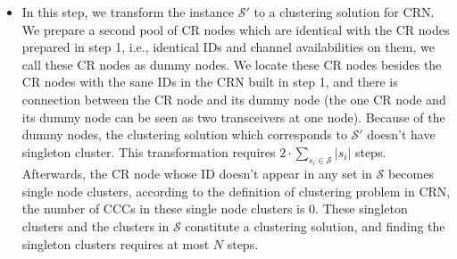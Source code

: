 \documentclass[10pt,journal,compsoc]{IEEEtran}
\makeatletter
\theoremstyle{mytheoremstyle}
\theoremstyle{mytheoremstyle}
\theoremstyle{mytheoremstyle}
\renewenvironment{proof}[1][\proofname]{%
      \par\pushQED{\qed}\fontfamily{ptm}\selectfont%
      \topsep6\p@\@plus6\p@\relax
      \trivlist\item[\hskip\labelsep\bfseries#1\@addpunct{.}]%
      \ignorespaces
    }{%
      \popQED\endtrivlist\@endpefalse
    }
\newcommand{\ie}{i.e., }
\makeatother
\begin{document}
\begin{proof}
\begin{itemize}
\item In this step, we transform the instance $\mathcal{S'}$ to a clustering solution for CRN.
We prepare a second pool of CR nodes which are identical with the CR nodes prepared in step 1, i.e., identical IDs and channel availabilities on them, we call these CR nodes as dummy nodes.
We locate these CR nodes besides the CR nodes with the sane IDs in the CRN built in step 1, and there is connection between the CR node and its dummy node (the one CR node and its dummy node can be seen as two transceivers at one node).
Because of the dummy nodes, the clustering solution which corresponds to $\mathcal{S'}$ doesn't have singleton cluster.
This transformation requires $2\cdot\sum_{s_i \in \mathcal{S}} |s_i|$ steps.
%
Afterwards, the CR node whose ID doesn't appear in any set in $\mathcal{S}$ becomes single node clusters, according to the definition of clustering problem in CRN, the number of CCCs in these single node clusters is 0.
These singleton clusters and the clusters in $\mathcal{S}$ constitute a clustering solution, and finding the singleton clusters requires at most $N$ steps.


\end{itemize}
\end{proof}
\end{document}

